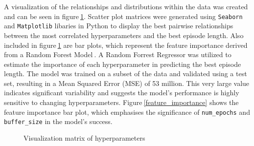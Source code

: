 A visualization of the relationships and distributions within the data was created and can be seen in figure$~$\ref{vis_matrix}. Scatter plot matrices were generated using \texttt{Seaborn} and \texttt{Matplotlib} libaries in Python to display the best pairwise relationships between the most correlated hyperparameters and the best episode length. Also included in figure$~$\ref{vis_matrix} are bar plots, which represent the feature importance derived from a Random Forest Model$~$\cite{randomforrestM}. A Random Forrest Regressor was utilized to estimate the importance of each hyperparameter in predicting the best episode length. The model was trained on a subset of the data and validated using a test set, resulting in a Mean Squared Error (MSE) of 53 million. This very large value indicates significant variability and suggests the model's performance is highly sensitive to changing hyperparameters. Figure$~$\ref{feature_importance} shows the feature importance bar plot, which emphasises the significance of \texttt{num\_epochs} and \texttt{buffer\_size} in the model's success.

\begin{figure}[!htb]
    \centering
    \caption{Visualization matrix of hyperparameters}\label{vis_matrix}
\end{figure}

